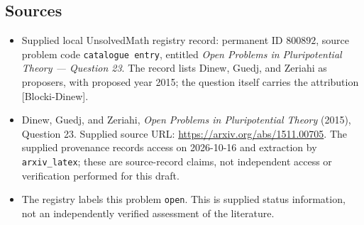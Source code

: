 \documentclass[11pt]{article}
\begin{document}
\subsection{Sources}
\begin{itemize}
\item Supplied local UnsolvedMath registry record: permanent ID \(800892\), source problem code \texttt{catalogue entry}, entitled \emph{Open Problems in Pluripotential Theory --- Question 23}. The record lists Dinew, Guedj, and Zeriahi as proposers, with proposed year 2015; the question itself carries the attribution \textup{[Blocki-Dinew]}.
\item Dinew, Guedj, and Zeriahi, \emph{Open Problems in Pluripotential Theory} (2015), Question 23. Supplied source URL: \url{https://arxiv.org/abs/1511.00705}. The supplied provenance records access on 2026-10-16 and extraction by \texttt{arxiv\_latex}; these are source-record claims, not independent access or verification performed for this draft.
\item The registry labels this problem \texttt{open}. This is supplied status information, not an independently verified assessment of the literature.
\end{itemize}
\end{document}
